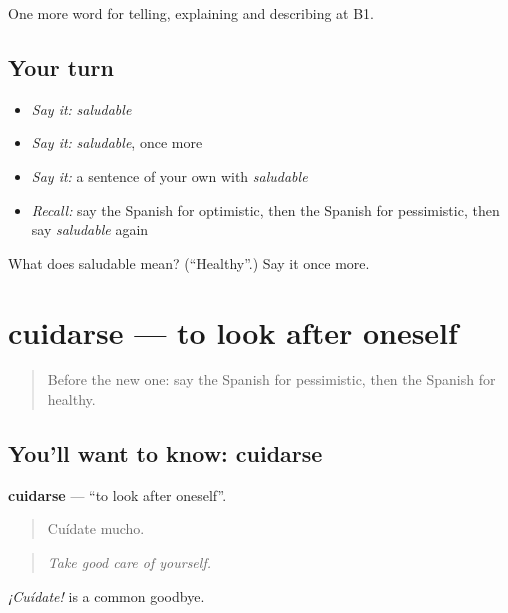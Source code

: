 \begin{grammarlens}[title={What you've built}]
One more word for telling, explaining and describing at B1.
\end{grammarlens}

\subsection*{Your turn}
\begin{itemize}
\raggedright
  \item \emph{Say it:} \emph{saludable}
  \item \emph{Say it:} \emph{saludable}, once more
  \item \emph{Say it:} a sentence of your own with \emph{saludable}
  \item \emph{Recall:} say the Spanish for optimistic, then the Spanish for pessimistic, then say \emph{saludable} again
\end{itemize}

\begin{tcolorbox}[breakable,colback=teal!4,colframe=teal!35!black,title={Before you move on}]
What does saludable mean? (\textquotedblleft{}Healthy\textquotedblright{}.) Say it once more.
\end{tcolorbox}
\section[cuidarse]{cuidarse — to look after oneself}

\label{lesson:ES-C732-cuidarse}



\begin{quote}
Before the new one: say the Spanish for pessimistic, then the Spanish for healthy.
\end{quote}

\subsection*{You'll want to know: cuidarse}
\textbf{cuidarse} — \textquotedblleft{}to look after oneself\textquotedblright{}.

\begin{quote}
Cuídate mucho.
\end{quote}

\begin{quote}
\emph{Take good care of yourself.}
\end{quote}

\emph{¡Cuídate!} is a common goodbye.

